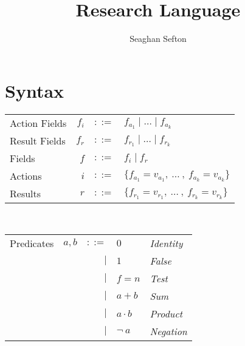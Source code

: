 \documentclass[12pt, letterpaper]{article}
\title{Research Language}
\author{Seaghan Sefton}
\begin{document}
\section*{Syntax}


    \begin{tabular}{l r c l}
        Action Fields   & $f_{i}$   & $::=$     & $f_{a_{1}} \mid \dots \mid f_{a_{k}}$\\
        Result Fields   & $f_{r}$   & $::=$     & $f_{r_{1}} \mid \dots \mid f_{r_{k}}$\\
        Fields          & $f$       & $::=$     & $f_i \mid f_r$ \\
        Actions         & $i$       & $::=$     & $\{f_{a_{1}} = v_{a_{1}} ,\ \dots\ ,\ f_{a_{k}} = v_{a_{k}}\}$\\
        Results         & $r$       & $::=$     & $\{f_{r_{1}} = v_{r_{1}} ,\ \dots\ ,\ f_{r_{k}} = v_{r_{k}}\}$\\
    \end{tabular}\\
    \begin{tabular}{l c r l l}
        Predicates  & $a,b$     & $::=$  & $0$          & \textit{Identity} \\
                    &           & $\mid$ & $1$          & \textit{False}    \\
                    &           & $\mid$ & $f=n$        & \textit{Test} \\  
                    &           & $\mid$ & $a + b$      & \textit{Sum}      \\
                    &           & $\mid$ & $a \cdot b$  & \textit{Product}  \\
                    &           & $\mid$ & $\neg \ a$   & \textit{Negation}
    \end{tabular}\\
\end{document}
